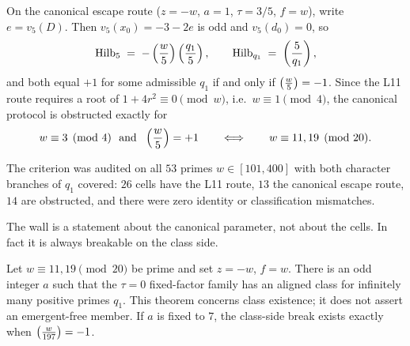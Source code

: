 \begin{theorem}
\label{thm:fivewall}
On the canonical escape route ($z=-w$, $a=1$, $\tau=3/5$, $f=w$), write
$e = v_5(D)$. Then $v_5(x_0) = -3-2e$ is odd and $v_5(d_0)=0$, so
\[
   \mathrm{Hilb}_5 \;=\; -\left(\frac{w}{5}\right)\left(\frac{q_1}{5}\right),
   \qquad
   \mathrm{Hilb}_{q_1} \;=\; \left(\frac{5}{q_1}\right) ,
\]
and both equal $+1$ for some admissible $q_1$ if and only if
$\left(\frac{w}{5}\right) = -1$. Since the L11 route requires a root of
$1+4r^2 \equiv 0 \pmod w$, i.e.\ $w \equiv 1 \pmod 4$, the canonical
protocol is obstructed exactly for
\[
   w \equiv 3 \pmod 4 \ \text{ and } \ \left(\frac{w}{5}\right) = +1
   \qquad\Longleftrightarrow\qquad
   w \equiv 11, 19 \pmod{20}.
\]
\end{theorem}

The criterion was audited on all $53$ primes $w \in [101,400]$ with both
character branches of $q_1$ covered: $26$ cells have the L11 route, $13$
the canonical escape route, $14$ are obstructed, and there were zero
identity or classification mismatches.

The wall is a statement about the canonical parameter, not about the cells.
In fact it is always breakable on the class side.

\begin{theorem}
\label{prop:break}
Let $w\equiv11,19\pmod{20}$ be prime and set $z=-w$, $f=w$.  There is an
odd integer $a$ such that the $\tau=0$ fixed-factor family has an aligned
class for infinitely many positive primes $q_1$.  This theorem concerns
class existence; it does not assert an emergent-free member.  If $a$ is
fixed to $7$, the class-side break exists exactly when
$\left(\frac{w}{197}\right)=-1$.
\end{theorem}

